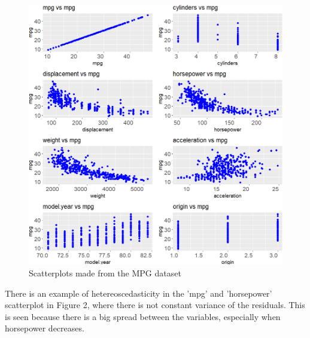 \begin{figure}[h]
	\includegraphics[width=\linewidth]{billder/2.png}
	\caption{Scatterplots made from the MPG dataset}
	\label{fig:2}
\end{figure}
There is an example of hetereoscedasticity in the 'mpg' and 'horsepower' scatterplot in Figure 2, where there is not constant variance of the residuals. This is seen because there is a big spread between the variables, especially when horsepower decreases.   

